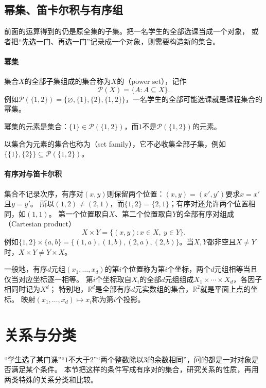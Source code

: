 \subsection{幂集、笛卡尔积与有序组}
\label{sec:sets-power-sets-products}

前面的运算得到的仍是原全集的子集。把一名学生的全部选课当成一个对象，
或者把“先选一门、再选一门”记录成一个对象，则需要构造新的集合。

\paragraph{幂集}
集合$X$的全部子集组成的集合称为$X$的（power set），记作
\[
 \mathcal P(X)=\{A:A\subseteq X\}.
\]
例如$\mathcal P(\{1,2\})=\{\varnothing,\{1\},\{2\},\{1,2\}\}$，一名学生的全部可能选课就是课程集合的幂集。

幂集的元素是集合：$\{1\}\in\mathcal P(\{1,2\})$，而$1$不是$\mathcal P(\{1,2\})$的元素。

以集合为元素的集合也称为（set family），它不必收集全部子集，例如$\{\{1\},\{2\}\}\subseteq\mathcal P(\{1,2\})$。

\paragraph{有序对与笛卡尔积}
集合不记录次序，有序对$(x,y)$则保留两个位置：$(x,y)=(x',y')$要求$x=x'$且$y=y'$。
所以$(1,2)\neq(2,1)$，而$\{1,2\}=\{2,1\}$；有序对还允许两个位置相同，如$(1,1)$。
第一个位置取自$X$、第二个位置取自$Y$的全部有序对组成（Cartesian product）
\[
 X\times Y=\{(x,y):x\in X,\ y\in Y\}.
\]
例如$\{1,2\}\times\{a,b\}=\{(1,a),(1,b),(2,a),(2,b)\}$。当$X,Y$都非空且$X\neq Y$时，$X\times Y\neq Y\times X$。

一般地，有序$d$元组$(x_1,\ldots,x_d)$的第$i$个位置称为第$i$个坐标，两个$d$元组相等当且仅当对应坐标逐一相等。
第$i$个坐标取自$X_i$的全部$d$元组组成$X_1\times\cdots\times X_d$，各因子相同时记为$X^d$；
特别地，$\mathbb R^d$是全部有序$d$元实数组的集合，$\mathbb R^2$就是平面上点的坐标。
映射$(x_1,\ldots,x_d)\mapsto x_i$称为第$i$个投影。

\section{关系与分类}
\label{sec:prelim-binary-relations}

“学生选了某门课”“$1$不大于$2$”“两个整数除以$3$的余数相同”，问的都是一对对象是否满足某个条件。
本节把这样的条件写成有序对的集合，研究关系的性质，再用两类特殊的关系分类和比较。

